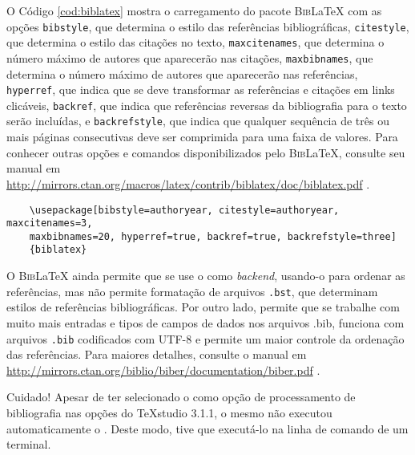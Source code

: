 O Código \ref{cod:biblatex} mostra o carregamento do pacote \textsc{Bib}\LaTeX{} com as opções \texttt{bibstyle}, que determina o estilo das referências bibliográficas, \texttt{citestyle}, que determina o estilo das citações no texto, \texttt{maxcitenames}, que determina o número máximo de autores que aparecerão nas citações, \texttt{maxbibnames}, que determina o número máximo de autores que aparecerão nas referências, \texttt{hyperref}, que indica que se deve transformar as referências e citações em links clicáveis, \texttt{backref}, que indica que referências reversas da bibliografia para o texto serão incluídas, e \texttt{backrefstyle}, que indica que qualquer sequência de três ou mais páginas consecutivas deve ser comprimida para uma faixa de valores. Para conhecer outras opções e comandos disponibilizados pelo \textsc{Bib}\LaTeX{}, consulte seu manual em \url{http://mirrors.ctan.org/macros/latex/contrib/biblatex/doc/biblatex.pdf} \parencite{biblatex}.

\begin{listing}[ht]
	\begin{verbatim}
	\usepackage[bibstyle=authoryear, citestyle=authoryear, maxcitenames=3, 
	maxbibnames=20, hyperref=true, backref=true, backrefstyle=three]
	{biblatex}
	\end{verbatim}
	\caption{Carregamento do pacote \textsc{Bib}\LaTeX{} com as opções usadas neste modelo.}
	\label{cod:biblatex}
\end{listing}

O \textsc{Bib}\LaTeX{} ainda permite que se use o  como \textit{backend}, usando-o para ordenar as referências, mas não permite formatação de arquivos \texttt{.bst}, que determinam estilos de referências bibliográficas. Por outro lado,  permite que se trabalhe com muito mais entradas e tipos de campos de dados nos arquivos .bib, funciona com arquivos \texttt{.bib} codificados com UTF-8 e permite um maior controle da ordenação das referências. Para maiores detalhes, consulte o manual em \url{http://mirrors.ctan.org/biblio/biber/documentation/biber.pdf} \parencite{biber}.

\begin{bclogo}[
	couleur=bgblue,
	arrondi=0,
	logo=\faWarning,%
	barre=none,
	noborder=true]{Cuidado!}
	Apesar de ter selecionado o  como opção de processamento de bibliografia nas opções do \TeX{}studio 3.1.1,\index{} o mesmo não executou automaticamente o . Deste modo, tive que executá-lo na linha de comando de um terminal.
\end{bclogo}

